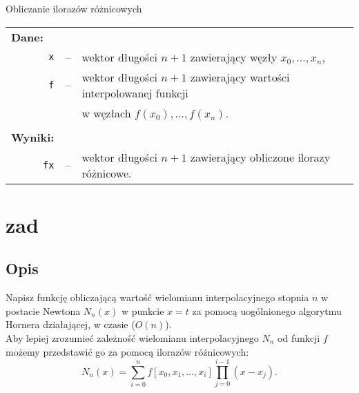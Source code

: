 \documentclass[10pt,a4paper, polish]{article}
\begin{document}
\begin{algorithm}[h]
				\DontPrintSemicolon
    			

\caption{Obliczanie ilorazów różnicowych}
\end{algorithm} 

\begin{longtable}[l]{r  c  l}
\multicolumn{1}{l}{\textbf{Dane:}}&& \\
\texttt{x}&--&wektor długości $n+1$ zawierający węzły $x_0, \ldots, x_n$, \\
\texttt{f}&--&wektor długości $n+1$ zawierający wartości interpolowanej funkcji \\
&&w węzłach $f(x_0), \ldots, f(x_n)$. \\
&& \\
\multicolumn{1}{l}{\textbf{Wyniki:}}&& \\
\texttt{fx}&--&wektor długości $n+ 1$ zawierający obliczone ilorazy różnicowe. \\
\end{longtable}

\section{zad}

\subsection*{Opis}
Napisz funkcję obliczającą wartość wielomianu interpolacyjnego stopnia $n$ w postacie Newtona $N_{n}(x)$ w punkcie $x = t$ za pomocą uogólnionego algorytmu Hornera działającej, w czasie ($O(n)$). \\

\noindent Aby lepiej zrozumieć zależność wielomianu interpolacyjnego $N_n$ od funkcji $f$ możemy przedstawić go za pomocą ilorazów różnicowych:
$$N_n(x) = \sum_{i=0}^n f[x_0,x_{1}, \ldots, x_{i}] \prod_{j=0}^{i-1}(x-x_j).$$
\end{document}
